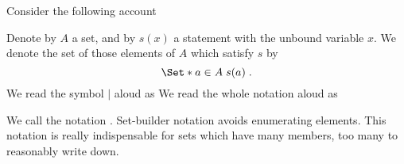 

Consider the following account
\begin{account}
\end{account}



Denote by $A$ a set, and by $s(x)$ a statement with the unbound variable $x$.
We denote the set of those elements of $A$ which satisfy $s$ by 
\[
  \Set*{a \in A}{\;s(a)\;}.
\]
We read the symbol $\mid$ aloud as 
We read the whole notation aloud as 

We call the notation
.
Set-builder notation avoids enumerating
elements.
This notation is really indispensable for
sets which have many members, too many
to reasonably write down.


%
%

